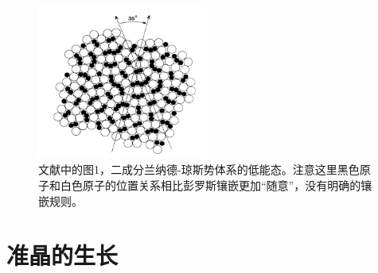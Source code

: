 \documentclass[hyperref, UTF8, a4paper]{ctexart}
\begin{document}
\begin{figure}
    \centering
    \includegraphics[width=0.5\textwidth]{10fold.PNG}
    \caption{文献\cite{PhysRevLett.58.706}中的图1，二成分兰纳德-琼斯势体系的低能态。注意这里黑色原子和白色原子的位置关系相比彭罗斯镶嵌更加“随意”，没有明确的镶嵌规则。}
    \label{fig:10fold}
\end{figure}

\section{准晶的生长}
\end{document}
